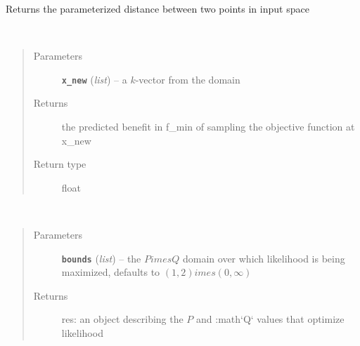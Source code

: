 \documentclass[letterpaper,10pt,english]{sphinxmanual}
\begin{document}
\begin{fulllineitems}
\begin{fulllineitems}
\begin{quote}
\begin{description}
\end{description}\end{quote}

\end{fulllineitems}


\begin{fulllineitems}
\label{index:smbo.models.dace.dist}
Returns the parameterized distance between two points in input space

\end{fulllineitems}


\begin{fulllineitems}
\label{index:smbo.models.dace.exp_improvement}~\begin{quote}\begin{description}
\item[{Parameters}] \leavevmode
\textbf{\texttt{x\_new}} (\emph{list}) -- a \(k\)-vector from the domain

\item[{Returns}] \leavevmode
the predicted benefit in f\_min of sampling the objective function at x\_new

\item[{Return type}] \leavevmode
float

\end{description}\end{quote}

\end{fulllineitems}


\begin{fulllineitems}
\label{index:smbo.models.dace.max_likelihood}~\begin{quote}\begin{description}
\item[{Parameters}] \leavevmode
\textbf{\texttt{bounds}} (\emph{list}) -- the \(P  imes Q\) domain over which likelihood is being maximized, defaults to \((1,2)       imes(0,\infty)\)

\item[{Returns}] \leavevmode
res: an object describing the \(P\) and :math{}`Q{}` values that optimize likelihood


\end{description}
\end{quote}
\end{fulllineitems}
\end{fulllineitems}
\end{document}

